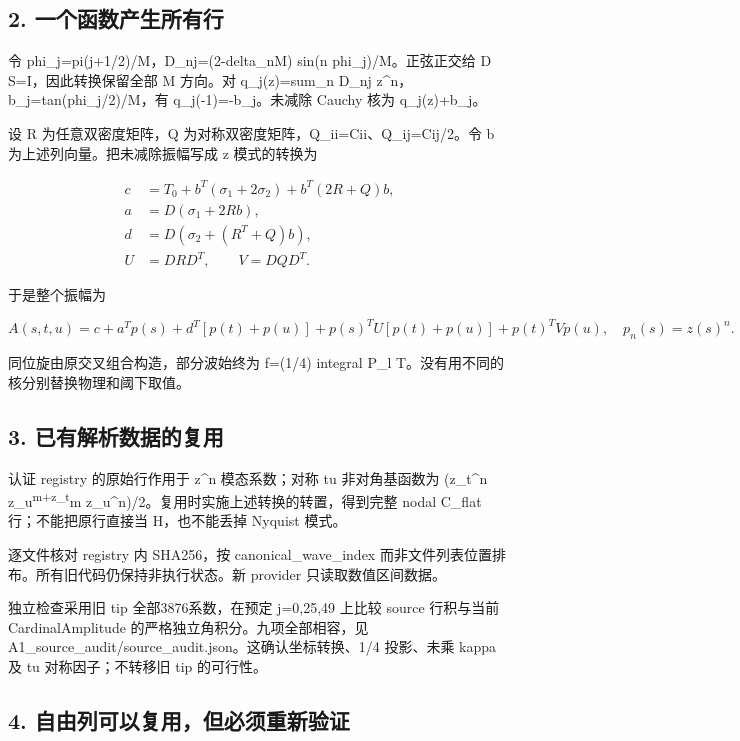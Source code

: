 \documentclass[
  10pt,
  a4paper,
]{article}
\begin{document}
\subsection{2.
一个函数产生所有行}\label{ux4e00ux4e2aux51fdux6570ux4ea7ux751fux6240ux6709ux884c}

令 phi\_j=pi(j+1/2)/M，D\_nj=(2-delta\_nM) sin(n phi\_j)/M。正弦正交给 D
S=I，因此转换保留全部 M 方向。对 q\_j(z)=sum\_n D\_nj
z\^{}n，b\_j=tan(phi\_j/2)/M，有 q\_j(-1)=-b\_j。未减除 Cauchy 核为
q\_j(z)+b\_j。

设 R 为任意双密度矩阵，Q 为对称双密度矩阵，Q\_ii=Cii、Q\_ij=Cij/2。令 b
为上述列向量。把未减除振幅写成 z 模式的转换为

\[
\begin{aligned}
c&=T_0+b^T(\sigma_1+2\sigma_2)+b^T(2R+Q)b,\\
a&=D(\sigma_1+2Rb),\\
d&=D(\sigma_2+(R^T+Q)b),\\
U&=DRD^T,\qquad V=DQD^T.
\end{aligned}
\]

于是整个振幅为

\[
A(s,t,u)=c+a^Tp(s)+d^T[p(t)+p(u)]
+p(s)^TU[p(t)+p(u)]+p(t)^TVp(u),
\quad p_n(s)=z(s)^n.
\]

同位旋由原交叉组合构造，部分波始终为 f=(1/4) integral P\_l
T。没有用不同的核分别替换物理和阈下取值。

\subsection{3.
已有解析数据的复用}\label{ux5df2ux6709ux89e3ux6790ux6570ux636eux7684ux590dux7528}

认证 registry 的原始行作用于 z\^{}n 模态系数；对称 tu 非对角基函数为
(z\_t\^{}n z\_u\textsuperscript{m+z\_t}m
z\_u\^{}n)/2。复用时实施上述转换的转置，得到完整 nodal C\_flat
行；不能把原行直接当 H，也不能丢掉 Nyquist 模式。

逐文件核对 registry 内 SHA256，按 canonical\_wave\_index
而非文件列表位置排布。所有旧代码仍保持非执行状态。新 provider
只读取数值区间数据。

独立检查采用旧 tip 全部3876系数，在预定 j=0,25,49 上比较 source
行积与当前 CardinalAmplitude 的严格独立角积分。九项全部相容，见
A1\_source\_audit/source\_audit.json。这确认坐标转换、1/4 投影、未乘
kappa 及 tu 对称因子；不转移旧 tip 的可行性。

\subsection{4.
自由列可以复用，但必须重新验证}\label{ux81eaux7531ux5217ux53efux4ee5ux590dux7528ux4f46ux5fc5ux987bux91cdux65b0ux9a8cux8bc1}
\end{document}

